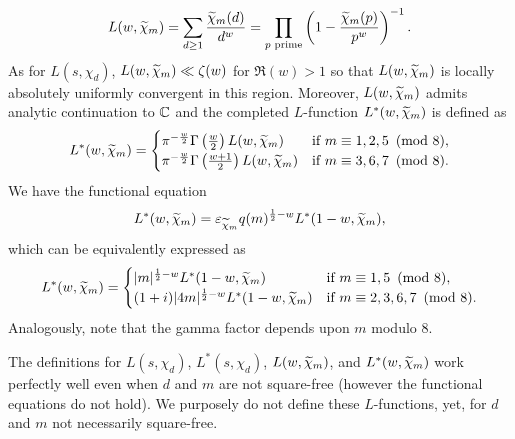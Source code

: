    \[
        L(w,\widetilde{\chi}_{m}) = \sum_{d \ge 1}\frac{\widetilde{\chi}_{m}(d)}{d^{w}} = \prod_{p \text{ prime}}\left(1-\frac{\widetilde{\chi}_{m}(p)}{p^{w}}\right)^{-1}.
    \]
    As for $L(s,\chi_{d})$, $L(w,\widetilde{\chi}_{m}) \ll \zeta(w)$ for $\Re(w) > 1$ so that $L(w,\widetilde{\chi}_{m})$ is locally absolutely uniformly convergent in this region. Moreover, $L(w,\widetilde{\chi}_{m})$ admits analytic continuation to $\mathbb{C}$ and the completed $L$-function $L^{\ast}(w,\widetilde{\chi}_{m})$ is defined as
    \[
        L^{\ast}(w,\widetilde{\chi}_{m}) = \begin{cases} \pi^{-\frac{w}{2}}\Gamma\left(\frac{w}{2}\right)L(w,\widetilde{\chi}_{m}) & \text{if $m \equiv 1,2,5 \ \left(\text{mod }8\right)$}, \\ \pi^{-\frac{w}{2}}\Gamma\left(\frac{w+1}{2}\right)L(w,\widetilde{\chi}_{m}) & \text{if $m \equiv 3,6,7 \ \left(\text{mod }8\right)$}. \end{cases}
    \]
    We have the functional equation
    \[
        L^{\ast}(w,\widetilde{\chi}_{m}) = \varepsilon_{\widetilde{\chi}_{m}}q(m)^{\frac{1}{2}-w}L^{\ast}(1-w,\widetilde{\chi}_{m}),
    \]
    which can be equivalently expressed as
    \[
        L^{\ast}(w,\widetilde{\chi}_{m}) = \begin{cases} |m|^{\frac{1}{2}-w}L^{\ast}(1-w,\widetilde{\chi}_{m}) & \text{if $m \equiv 1,5 \ \left(\text{mod }8\right)$}, \\ (1+i)|4m|^{\frac{1}{2}-w}L^{\ast}(1-w,\widetilde{\chi}_{m}) & \text{if $m \equiv 2,3,6,7 \ \left(\text{mod }8\right)$}. \end{cases}
    \]
    Analogously, note that the gamma factor depends upon $m$ modulo $8$.

    \begin{remark}
        The definitions for $L(s,\chi_{d})$, $L^{\ast}(s,\chi_{d})$, $L(w,\widetilde{\chi}_{m})$, and $L^{\ast}(w,\widetilde{\chi}_{m})$ work perfectly well even when $d$ and $m$ are not square-free (however the functional equations do not hold). We purposely do not define these $L$-functions, yet, for $d$ and $m$ not necessarily square-free.
    \end{remark}
